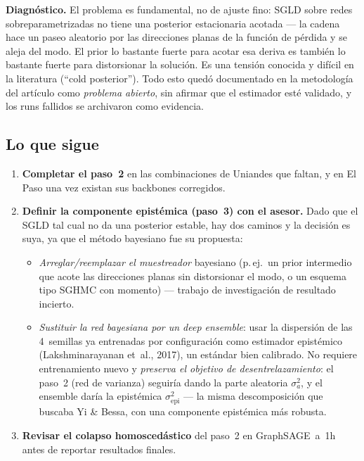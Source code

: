 \documentclass[12pt,a4paper]{article}
\begin{document}
\textbf{Diagnóstico.} El problema es fundamental, no de ajuste fino: SGLD
sobre redes sobreparametrizadas no tiene una posterior estacionaria acotada
--- la cadena hace un paseo aleatorio por las direcciones planas de la
función de pérdida y se aleja del modo. El prior lo bastante fuerte para
acotar esa deriva es también lo bastante fuerte para distorsionar la
solución. Es una tensión conocida y difícil en la literatura (``cold
posterior''). Todo esto quedó documentado en la metodología del artículo como
\emph{problema abierto}, sin afirmar que el estimador esté validado, y los
runs fallidos se archivaron como evidencia.

\subsection{Lo que sigue}

\begin{enumerate}[leftmargin=1.6em, noitemsep]
  \item \textbf{Completar el paso~2} en las combinaciones de Uniandes que
        faltan, y en El Paso una vez existan sus backbones corregidos.
  \item \textbf{Definir la componente epistémica (paso~3) con el asesor.} Dado
        que el SGLD tal cual no da una posterior estable, hay dos caminos y la
        decisión es suya, ya que el método bayesiano fue su propuesta:
        \begin{itemize}[leftmargin=1.3em, noitemsep]
          \item \emph{Arreglar/reemplazar el muestreador} bayesiano (p.\,ej.\
                un prior intermedio que acote las direcciones planas sin
                distorsionar el modo, o un esquema tipo SGHMC con momento) ---
                trabajo de investigación de resultado incierto.
          \item \emph{Sustituir la red bayesiana por un deep ensemble}: usar
                la dispersión de las 4~semillas ya entrenadas por
                configuración como estimador epistémico
                (Lakshminarayanan et~al., 2017), un estándar bien calibrado.
                No requiere entrenamiento nuevo y \emph{preserva el objetivo
                de desentrelazamiento}: el paso~2 (red de varianza) seguiría
                dando la parte aleatoria $\sigma_a^2$, y el ensemble daría la
                epistémica $\sigma_\text{epi}^2$ --- la misma descomposición
                que buscaba Yi \& Bessa, con una componente epistémica más
                robusta.
        \end{itemize}
  \item \textbf{Revisar el colapso homoscedástico} del paso~2 en GraphSAGE~a~1h
        antes de reportar resultados finales.
\end{enumerate}
\end{document}
